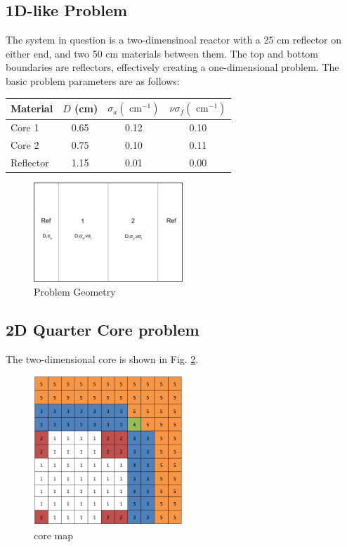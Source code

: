 \documentclass[11pt]{article} %
\begin{document}
\subsection{1D-like Problem}
The system in question is a two-dimensinoal reactor with a 25 cm reflector on either end, and two 50 cm materials between them.  The top and bottom boundaries are reflectors, effectively creating a one-dimensional problem.  The basic problem parameters are as follows:
\begin{center}
\begin{tabular}{l|c c c}
Material & $D$ (cm)& $\sigma_a (\text{ cm}^{-1})$ & $\nu\sigma_f(\text{ cm}^{-1})$ \\ \hline
Core 1 & 0.65 & 0.12 & 0.10 \\
Core 2 & 0.75 & 0.10 & 0.11 \\
Reflector & 1.15 & 0.01 & 0.00
\end{tabular}
\end{center}
\begin{figure}[h!]
\centering
   \includegraphics[width=0.5\textwidth]{geom}
   \caption{Problem Geometry}
   \label{geom}
\end{figure}
\subsection{2D Quarter Core problem}
The two-dimensional core is shown in Fig. \ref{coremap}.
\begin{figure}[h!]
\centering
   \includegraphics[width=0.5\textwidth]{core}
   \caption{core map}
   \label{coremap}
\end{figure}
\end{document}
